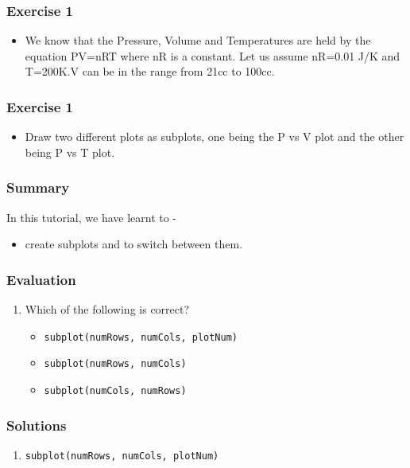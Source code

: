 \documentclass[17pt]{beamer}
\begin{document}
\begin{frame}
\frametitle{Exercise 1}
\label{sec-6}
\begin{itemize}
\item We know that the Pressure, Volume and Temperatures are held by the equation PV=nRT where nR is a constant. Let us assume nR=0.01 J/K and T=200K.V can be in the range from 21cc to 100cc.
\end{itemize}
\end{frame}
\begin{frame}
\frametitle{Exercise 1}
\label{sec-6}
\begin{itemize}
\item  Draw two different plots as subplots, one being the P vs V plot and the other being P vs T plot.
\end{itemize}
\end{frame}

\begin{frame}
\frametitle{Summary}
\label{sec-7}
In this tutorial, we have learnt to -\pause
\begin{itemize}
\item create subplots and to switch between them.
\end{itemize}
\end{frame}

\begin{frame}
\frametitle{Evaluation}
\label{sec-8}
\begin{enumerate}
\item Which of the following is correct?
\begin{itemize}
\item \texttt{subplot(numRows, numCols, plotNum)}
\item \texttt{subplot(numRows, numCols)}
\item \texttt{subplot(numCols, numRows)}
\end{itemize}
\end{enumerate}
\end{frame}

\begin{frame}
\frametitle{Solutions}
\label{sec-9}
\begin{enumerate}
\item \texttt{subplot(numRows, numCols, plotNum)}
\end{enumerate}
\end{frame}
\end{document}
